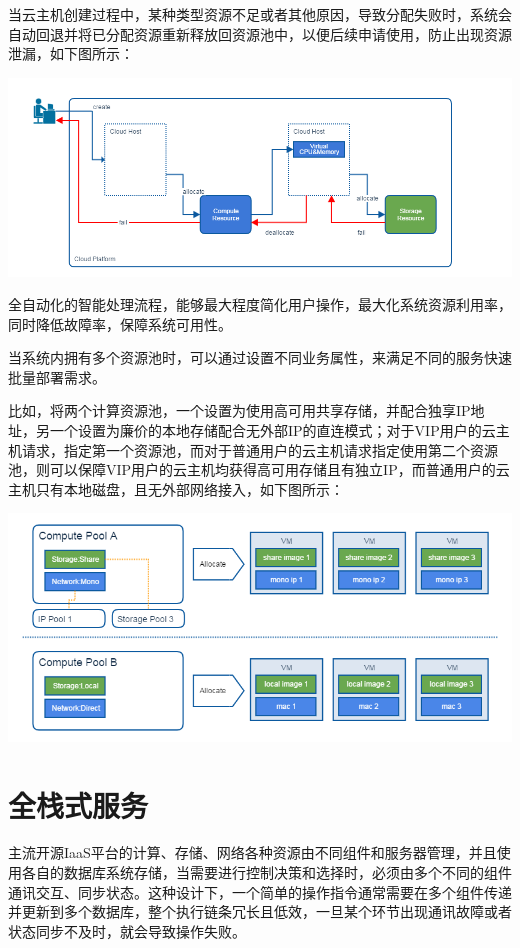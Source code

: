 \documentclass[letterpaper,10pt]{sphinxmanual}
\begin{document}
当云主机创建过程中，某种类型资源不足或者其他原因，导致分配失败时，系统会自动回退并将已分配资源重新释放回资源池中，以便后续申请使用，防止出现资源泄漏，如下图所示：

\includegraphics{1_2_2_resource_recycling.png}

全自动化的智能处理流程，能够最大程度简化用户操作，最大化系统资源利用率，同时降低故障率，保障系统可用性。

当系统内拥有多个资源池时，可以通过设置不同业务属性，来满足不同的服务快速批量部署需求。

比如，将两个计算资源池，一个设置为使用高可用共享存储，并配合独享IP地址，另一个设置为廉价的本地存储配合无外部IP的直连模式；对于VIP用户的云主机请求，指定第一个资源池，而对于普通用户的云主机请求指定使用第二个资源池，则可以保障VIP用户的云主机均获得高可用存储且有独立IP，而普通用户的云主机只有本地磁盘，且无外部网络接入，如下图所示：

\includegraphics{1_2_3_fast_deployment.png}


\section{全栈式服务}
\label{index:id6}
主流开源IaaS平台的计算、存储、网络各种资源由不同组件和服务器管理，并且使用各自的数据库系统存储，当需要进行控制决策和选择时，必须由多个不同的组件通讯交互、同步状态。这种设计下，一个简单的操作指令通常需要在多个组件传递并更新到多个数据库，整个执行链条冗长且低效，一旦某个环节出现通讯故障或者状态同步不及时，就会导致操作失败。
\end{document}
